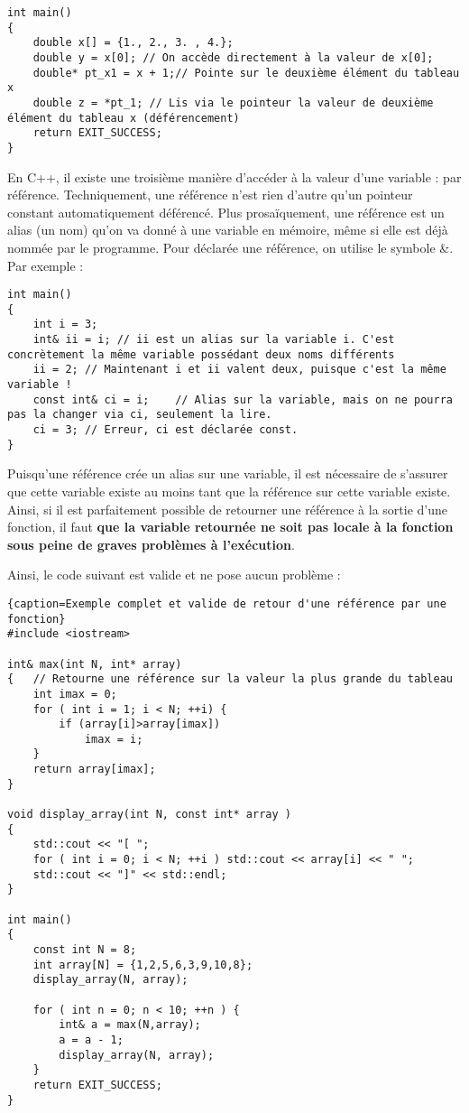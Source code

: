 \begin{lstlisting}
int main()
{
    double x[] = {1., 2., 3. , 4.};
    double y = x[0]; // On accède directement à la valeur de x[0];
    double* pt_x1 = x + 1;// Pointe sur le deuxième élément du tableau x
    double z = *pt_1; // Lis via le pointeur la valeur de deuxième élément du tableau x (déférencement)
    return EXIT_SUCCESS;    
}
\end{lstlisting}

En C++, il existe une troisième manière d'accéder à la valeur d'une variable : par référence. Techniquement, une référence n'est rien d'autre qu'un pointeur constant automatiquement déférencé. Plus prosaïquement, une référence est un alias (un nom) qu'on va donné à une variable en mémoire, même si elle est déjà nommée par le programme. Pour déclarée une référence, on utilise le symbole \&. Par exemple :

\begin{lstlisting}[caption=Exemple de référence en C++]
int main()
{
    int i = 3;
    int& ii = i; // ii est un alias sur la variable i. C'est concrètement la même variable possédant deux noms différents
    ii = 2; // Maintenant i et ii valent deux, puisque c'est la même variable !
    const int& ci = i;    // Alias sur la variable, mais on ne pourra pas la changer via ci, seulement la lire.
    ci = 3; // Erreur, ci est déclarée const.
}
\end{lstlisting}

Puisqu'une référence crée un alias sur une variable, il est nécessaire de s'assurer que cette variable existe au moins tant que la référence sur cette variable existe. Ainsi, si il est parfaitement possible de retourner une référence à la sortie d'une fonction, il faut \textbf{que la variable retournée ne soit pas locale à la fonction sous peine de graves problèmes à l'exécution}.

Ainsi, le code suivant est valide et ne pose aucun problème :

\begin{lstlisting}{caption=Exemple complet et valide de retour d'une référence par une fonction}
#include <iostream>

int& max(int N, int* array)
{   // Retourne une référence sur la valeur la plus grande du tableau
    int imax = 0;
    for ( int i = 1; i < N; ++i) {
        if (array[i]>array[imax])
            imax = i;
    }
    return array[imax];
}

void display_array(int N, const int* array )
{
    std::cout << "[ ";
    for ( int i = 0; i < N; ++i ) std::cout << array[i] << " ";
    std::cout << "]" << std::endl;
}

int main()
{
    const int N = 8;
    int array[N] = {1,2,5,6,3,9,10,8};
    display_array(N, array);

    for ( int n = 0; n < 10; ++n ) {
        int& a = max(N,array);
        a = a - 1;
        display_array(N, array);
    }
    return EXIT_SUCCESS;
}
\end{lstlisting}

